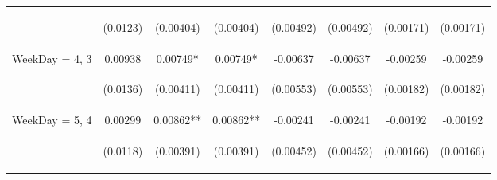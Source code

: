 \documentclass[]{article}
\begin{document}
\begin{center}
\begin{tabular}{lccccccc}
\vspace{4pt} & \begin{footnotesize}(0.0123)\end{footnotesize} & \begin{footnotesize}(0.00404)\end{footnotesize} & \begin{footnotesize}(0.00404)\end{footnotesize} & \begin{footnotesize}(0.00492)\end{footnotesize} & \begin{footnotesize}(0.00492)\end{footnotesize} & \begin{footnotesize}(0.00171)\end{footnotesize} & \begin{footnotesize}(0.00171)\end{footnotesize} \\
WeekDay = 4, 3 & 0.00938 & 0.00749* & 0.00749* & -0.00637 & -0.00637 & -0.00259 & -0.00259 \\
\vspace{4pt} & \begin{footnotesize}(0.0136)\end{footnotesize} & \begin{footnotesize}(0.00411)\end{footnotesize} & \begin{footnotesize}(0.00411)\end{footnotesize} & \begin{footnotesize}(0.00553)\end{footnotesize} & \begin{footnotesize}(0.00553)\end{footnotesize} & \begin{footnotesize}(0.00182)\end{footnotesize} & \begin{footnotesize}(0.00182)\end{footnotesize} \\
WeekDay = 5, 4 & 0.00299 & 0.00862** & 0.00862** & -0.00241 & -0.00241 & -0.00192 & -0.00192 \\
\vspace{4pt} & \begin{footnotesize}(0.0118)\end{footnotesize} & \begin{footnotesize}(0.00391)\end{footnotesize} & \begin{footnotesize}(0.00391)\end{footnotesize} & \begin{footnotesize}(0.00452)\end{footnotesize} & \begin{footnotesize}(0.00452)\end{footnotesize} & \begin{footnotesize}(0.00166)\end{footnotesize} & \begin{footnotesize}(0.00166)\end{footnotesize} \\

\end{tabular}
\end{center}
\end{document}
